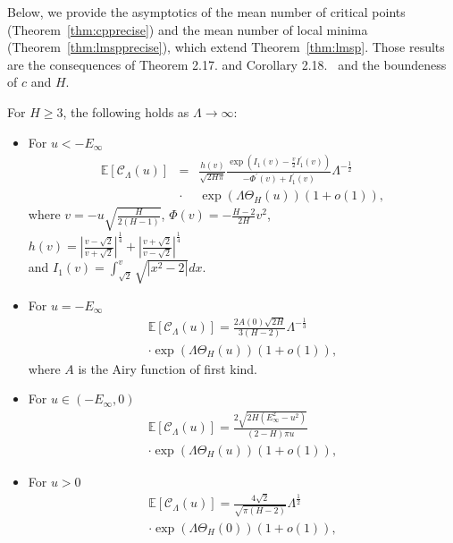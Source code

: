\documentclass[twoside]{article}
\begin{document}
Below, we provide the asymptotics of the mean number of critical points (Theorem~\ref{thm:cpprecise}) and the mean number of local minima (Theorem~\ref{thm:lmspprecise}), which extend Theorem~\ref{thm:lmsp}. Those results are the consequences of Theorem 2.17. and Corollary 2.18.~\cite{AAC2010} and the boundeness of $c$ and $H$.
\begin{theorem}
For $H \geq 3$, the following holds as $\Lambda \rightarrow \infty$:
\begin{itemize}
\item For $u < -E_{\infty}$\\
\begin{eqnarray*}
\mathbb{E}[\mathcal{C}_{\Lambda}(u)] \!\!\!&=&\!\!\! \frac{h(v)}{\sqrt{2H\pi}}\frac{\exp(I_1(v) - \frac{v}{2}I_1^{'}(v))}{-\Phi^{'}(v) + I_1^{'}(v)}\Lambda^{-\frac{1}{2}}\\
&\cdot& \exp\left(\Lambda\Theta_H(u)\right)(1 + o(1)),
\end{eqnarray*}
where $v = -u\sqrt{\frac{H}{2(H-1)}}$, $\Phi(v) = -\frac{H-2}{2H}v^2$,\\
$h(v) = \left|\frac{v-\sqrt{2}}{v + \sqrt{2}}\right|^{\frac{1}{4}} + \left|\frac{v+\sqrt{2}}{v - \sqrt{2}}\right|^{\frac{1}{4}}$\\
and $I_1(v) = \int_{\sqrt{2}}^{v}\sqrt{|x^2 - 2|}dx$.
\item For $u = -E_{\infty}$\\
\begin{eqnarray*}
\mathbb{E}[\mathcal{C}_{\Lambda}(u)] = \frac{2A(0)\sqrt{2H}}{3(H-2)}\Lambda^{-\frac{1}{3}}\\
\cdot\exp\left(\Lambda\Theta_H(u)\right)(1 + o(1)),
\end{eqnarray*}
where $A$ is the Airy function of first kind.
\item For $u \in (-E_{\infty},0)$\\
\begin{eqnarray*}
\mathbb{E}[\mathcal{C}_{\Lambda}(u)] = \frac{2\sqrt{2H(E_{\infty}^2-u^2)}}{(2-H)\pi u}\\
\cdot\exp\left(\Lambda \Theta_H(u)\right)(1 + o(1)),
\end{eqnarray*}
\item For $u > 0$\\
\begin{eqnarray*}
\mathbb{E}[\mathcal{C}_{\Lambda}(u)] = \frac{4\sqrt{2}}{\sqrt{\pi(H-2)}}\Lambda^{\frac{1}{2}}\\
\cdot\exp\left(\Lambda\Theta_H(0)\right)(1 + o(1)),
\end{eqnarray*}
\end{itemize}
\label{thm:cpprecise}
\end{theorem}
\end{document}

